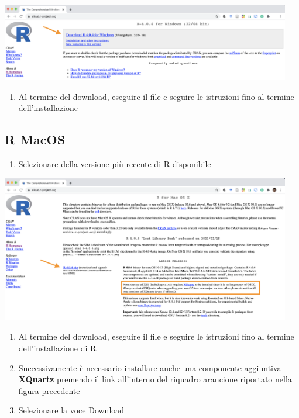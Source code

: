 \documentclass[
]{book}
\providecommand{\tightlist}{%
  \setlength{\itemsep}{0pt}\setlength{\parskip}{0pt}}
\begin{document}
\includegraphics[width=0.95\textwidth,height=\textheight]{images/install-Windows-version.png}

\begin{enumerate}
\def\labelenumi{\arabic{enumi}.}
\setcounter{enumi}{2}
\tightlist
\item
  Al termine del download, eseguire il file e seguire le istruzioni fino al termine dell'installazione
\end{enumerate}

\hypertarget{r-macos}{%
\subsection{R MacOS}\label{r-macos}}

\begin{enumerate}
\def\labelenumi{\arabic{enumi}.}
\tightlist
\item
  Selezionare della versione più recente di R disponibile
\end{enumerate}

\includegraphics[width=0.95\textwidth,height=\textheight]{images/install_Mac_version.png}

\begin{enumerate}
\def\labelenumi{\arabic{enumi}.}
\setcounter{enumi}{1}
\tightlist
\item
  Al termine del download, eseguire il file e seguire le istruzioni fino al termine dell'installazione di R
\item
  Successivamente è necessario installare anche una componente aggiuntiva \textbf{XQuartz} premendo il link all'interno del riquadro arancione riportato nella figura precedente
\item
  Selezionare la voce Download
\end{enumerate}
\end{document}
